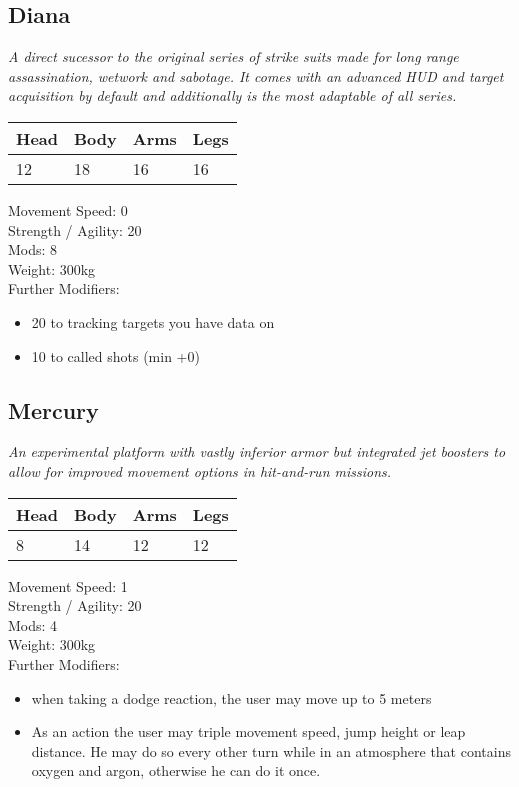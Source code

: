 \documentclass[12pt,a4paper,openany]{book}
\begin{document}
\begin{multicols}{2}
	\subsection{Diana}
	\textit{A direct sucessor to the original series of strike suits made for long range assassination, wetwork and sabotage. It comes with an advanced HUD and target acquisition by default and additionally is the most adaptable of all series.}\par
	\begin{tabular}{|l|l|l|l|}
		\hline
		Head & Body & Arms & Legs\\
		\hline
		12 & 18 & 16 & 16\\
		\hline
	\end{tabular}
	\par
	Movement Speed: 0\\
	Strength / Agility: 20\\
	Mods: 8\\
	Weight: 300kg\\
	Further Modifiers:
	\vspace{-8mm}
	\begin{itemize}
		\setlength\itemsep{-8mm}
		\item 20 to tracking targets you have data on
		\item 10 to called shots (min +0)
	\end{itemize}
	\par
	\subsection{Mercury}
	\textit{An experimental platform with vastly inferior armor but integrated jet boosters to allow for improved movement options in hit-and-run missions.}\par
	\begin{tabular}{|l|l|l|l|}
		\hline
		Head & Body & Arms & Legs\\
		\hline
		8 & 14 & 12 & 12\\
		\hline
	\end{tabular}
	\par
	Movement Speed: 1\\
	Strength / Agility: 20\\
	Mods: 4\\
	Weight: 300kg\\
	Further Modifiers:
	\vspace{-8mm}
	\begin{itemize}
		\setlength\itemsep{-8mm}
		\item when taking a dodge reaction, the user may move up to 5 meters
		\item As an action the user may triple movement speed, jump height or leap distance. He may do so every other turn while in an atmosphere that contains oxygen and argon, otherwise he can do it once.
	\end{itemize}
	\par

\end{multicols}
\end{document}
